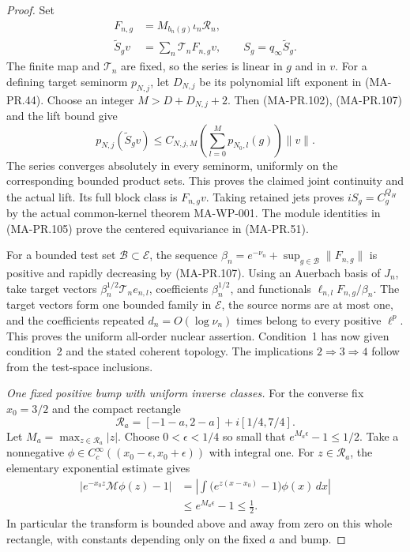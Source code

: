 \begin{proof}
Set
\[
 \begin{aligned}
 F_{n,g}&=M_{b_n(g)}\iota_n\mathscr R_n,\\
 \widetilde S_gv&=\sum_n\mathcal T_nF_{n,g}v,
             \qquad S_g=q_\infty\widetilde S_g .
 \end{aligned}
 \tag{MA-PR.108}
\]
The finite map and \(\mathcal T_n\) are fixed,
so the series is linear in \(g\) and in \(v\).
For a defining target seminorm \(p_{N,j}\), let
\(D_{N,j}\) be its polynomial lift exponent in
(MA-PR.44).  Choose an integer
\(M>D+D_{N,j}+2\).
Then (MA-PR.102), (MA-PR.107) and the lift bound give
\[
 p_{N,j}(\widetilde S_gv)
       \le C_{N,j,M}\left(\sum_{l=0}^{M}
                                   p_{N_0,l}(g)\right)\|v\|.
 \tag{MA-PR.109}
\]
The series converges absolutely in every seminorm,
uniformly on the corresponding bounded product sets.
This proves the claimed joint continuity and the
actual lift.  Its full block class is \(F_{n,g}v\).
Taking retained jets proves \(iS_g=C_g^{Q_H}\) by
the actual common-kernel theorem MA-WP-001.
The module identities in (MA-PR.105) prove the
centered equivariance in (MA-PR.51).

For a bounded test set \(\mathcal B\subset\mathcal E\),
the sequence
\(\beta_n=e^{-\nu_n}+\sup_{g\in\mathcal B}\|F_{n,g}\|\)
is positive and rapidly decreasing by (MA-PR.107).
Using an Auerbach basis of \(J_n\), take target
vectors \(\beta_n^{1/2}\mathcal T_ne_{n,l}\),
coefficients \(\beta_n^{1/2}\), and functionals
\(\ell_{n,l}F_{n,g}/\beta_n\).
The target vectors form one bounded family in
\(\mathcal E\), the source norms are at most one,
and the coefficients repeated \(d_n=O(\log\nu_n)\)
times belong to every positive \(\ell^p\).
This proves the uniform all-order nuclear assertion.
Condition~1 has now given condition~2 and the
stated coherent topology.  The implications
\(2\Rightarrow3\Rightarrow4\) follow from the
test-space inclusions.

\emph{One fixed positive bump with uniform inverse classes.}
For the converse fix \(x_0=3/2\) and the compact
rectangle
\[
 \mathcal R_a=[-1-a,2-a]
                           +i[1/4,7/4].
 \tag{MA-PR.110}
\]
Let \(M_a=\max_{z\in\mathcal R_a}|z|\).
Choose \(0<\epsilon<1/4\) so small that
\(e^{M_a\epsilon}-1\le1/2\).
Take a nonnegative \(\phi\in C_c^\infty
((x_0-\epsilon,x_0+\epsilon))\) with integral one.
For \(z\in\mathcal R_a\), the elementary exponential
estimate gives
\[
 \begin{split}
 \left|e^{-x_0z}\mathcal M\phi(z)-1\right|
   &=\left|\int\bigl(e^{z(x-x_0)}-1\bigr)\phi(x)\,dx\right|\\
   &\le e^{M_a\epsilon}-1\le\frac12 .
 \end{split}
 \tag{MA-PR.111}
\]
In particular the transform is bounded above and
away from zero on this whole rectangle, with
constants depending only on the fixed \(a\) and bump.


\end{proof}
